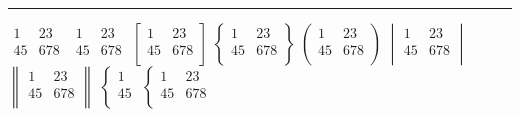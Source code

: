\documentclass{article}
\begin{document}
\START
\hrule\bigskip

$\begin{array}{rrr}
   1 &  23 \\
  45 & 678 \\
\end{array}$
$\begin{matrix}
   1 &  23 \\
  45 & 678 \\
\end{matrix}$
$\begin{bmatrix}
   1 &  23 \\
  45 & 678 \\
\end{bmatrix}$
$\begin{Bmatrix}
   1 &  23 \\
  45 & 678 \\
\end{Bmatrix}$
$\begin{pmatrix}
   1 &  23 \\
  45 & 678 \\
\end{pmatrix}$
$\begin{vmatrix}
   1 &  23 \\
  45 & 678 \\
\end{vmatrix}$
$\begin{Vmatrix}
   1 &  23 \\
  45 & 678 \\
\end{Vmatrix}$
$\begin{cases}
   1 \\
  45 \\
\end{cases}$
$\begin{cases}
   1 &  23 \\
  45 & 678 \\
\end{cases}$

\bigskip
\end{document}
